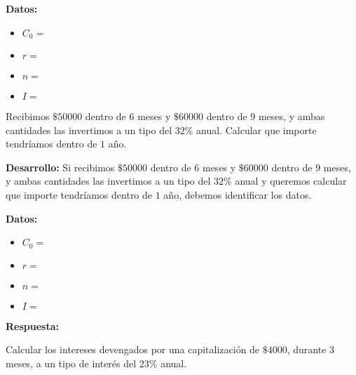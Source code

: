 \documentclass[12pt]{examdesign}
\theoremstyle{plain}
\theoremstyle{definition}
\theoremstyle{remark}
\begin{document}
\begin{shortanswer}[title={Leemos el material de consulta y realizamos las actividades propuestas.}, rearrange=no]
\begin{question}
\begin{answer}
        	    \textbf{Datos:}
        	    
        	    \begin{itemize}
        	    	\item $C_{0}=$
        	    	\item $r=$
        	    	\item $n=$
        	    	\item $I=$
        	    \end{itemize}
        	\end{answer}
        \end{question}
        
        \begin{question}
        	Recibimos $\$50000$ dentro de $6$ meses y $\$60000$ dentro de $9$ meses, y ambas cantidades las invertimos a un tipo del $32\%$ anual. Calcular que importe tendríamos dentro de $1$ año.
        	
        	\begin{answer}
        		\textbf{Desarrollo:} Si recibimos $\$50000$ dentro de $6$ meses y $\$60000$ dentro de $9$ meses, y ambas cantidades las invertimos a un tipo del $32\%$ anual y queremos calcular que importe tendríamos dentro de $1$ año, debemos identificar los datos.
        		
        		\textbf{Datos:}
        		\begin{itemize}
        			\item $C_{0}=$
        			\item $r=$
        			\item $n=$
        			\item $I=$
        		\end{itemize}
        	
        	    \textbf{Respuesta:}
        	\end{answer}
        \end{question}
        
        \begin{question}
        	Calcular los intereses devengados por una capitalización de $\$4000$, durante 3 meses, a un tipo de interés del $23\%$ anual.
        	

\end{question}
\end{shortanswer}
\end{document}
